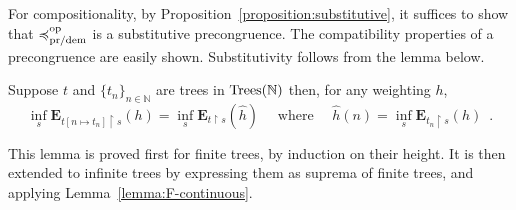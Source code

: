 For compositionality, by Proposition~\ref{proposition:substitutive}, it suffices to show
that $\preccurlyeq^{\text{op}}_{\text{pr/dem}}$ is a substitutive precongruence. The compatibility properties 
of a precongruence are easily shown. Substitutivity follows from the lemma below.
%
\begin{lemma}
Suppose $t$ and 
$\{ t_n \}_{n \in \mathbb{N}}$ are trees in 
            $\textnormal{Trees}(\mathbb{N})$ then, for any weighting $h$,
             \begin{equation*}
                \inf_s \mathbf{E}_{t [ n \mapsto t_n ] \restriction  s } (h)
                = 
                \inf_s \mathbf{E}_{t \restriction  s} (\hat{h})
                \quad \text{ where } \quad \hat{h} (n) = \inf_s \mathbf{E}_{t_n \restriction  s} (h) \enspace .
            \end{equation*}
\end{lemma}
This lemma is proved first for finite trees, by induction on their height. It is then extended to infinite trees
by expressing them as suprema of finite trees, and applying Lemma~\ref{lemma:F-continuous}.
%
%            
%
%
% 

